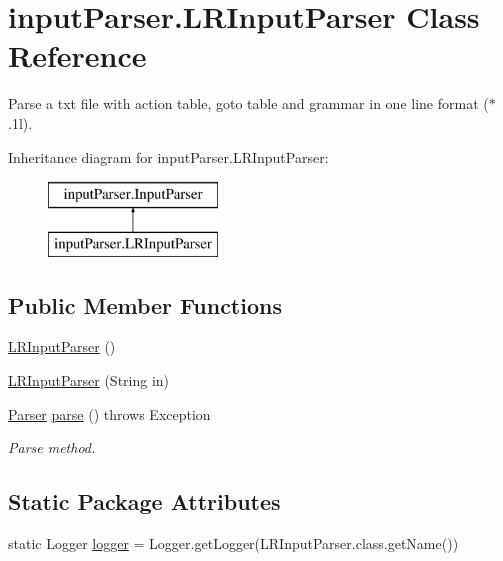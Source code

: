 \hypertarget{classinput_parser_1_1_l_r_input_parser}{\section{input\-Parser.\-L\-R\-Input\-Parser Class Reference}
\label{classinput_parser_1_1_l_r_input_parser}
}


Parse a txt file with action table, goto table and grammar in one line format ($\ast$.1l).  


Inheritance diagram for input\-Parser.\-L\-R\-Input\-Parser\-:\begin{figure}[H]
\begin{center}
\leavevmode
\includegraphics[height=2.000000cm]{classinput_parser_1_1_l_r_input_parser}
\end{center}
\end{figure}
\subsection*{Public Member Functions}
\begin{DoxyCompactItemize}
\item 
\hyperlink{classinput_parser_1_1_l_r_input_parser_a243ff5c225bbbe63bc64e615fed97ec4}{L\-R\-Input\-Parser} ()
\item 
\hyperlink{classinput_parser_1_1_l_r_input_parser_a42f9947db4e863a82e3a8ca89c655c2a}{L\-R\-Input\-Parser} (String in)
\item 
\hyperlink{classparser_program_1_1_parser}{Parser} \hyperlink{classinput_parser_1_1_l_r_input_parser_ab1fb2966ece506eead96dcededca86a6}{parse} ()  throws Exception 
\begin{DoxyCompactList}\small\item\em Parse method. \end{DoxyCompactList}\end{DoxyCompactItemize}
\subsection*{Static Package Attributes}
\begin{DoxyCompactItemize}
\item 
static Logger \hyperlink{classinput_parser_1_1_l_r_input_parser_ae3d6e07ebb7d4368f1a2e2ad05dae6f7}{logger} = Logger.\-get\-Logger(L\-R\-Input\-Parser.\-class.\-get\-Name())
\end{DoxyCompactItemize}
